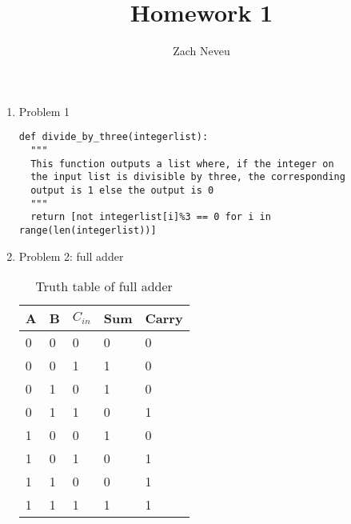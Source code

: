 \documentclass[12pt, letter]{article}
\author{Zach Neveu}
\title{ Homework 1 }
\begin{document}
\maketitle

\begin{enumerate}
	\item Problem 1
\begin{verbatim}
def divide_by_three(integerlist):
  """
  This function outputs a list where, if the integer on
  the input list is divisible by three, the corresponding
  output is 1 else the output is 0
  """
  return [not integerlist[i]%3 == 0 for i in range(len(integerlist))]
\end{verbatim}

	\item Problem 2: full adder
	\begin{table}[htpb]
		\centering
		\caption{Truth table of full adder}
		\label{tab:truth_table}
		\begin{tabular}{lllll}
		\toprule
		A & B & $C_{in}$ & Sum & Carry \\
		\midrule
		0 & 0 & 0 & 0 & 0 \\
		\midrule
		0 & 0 & 1 & 1 & 0 \\
		\midrule
		0 & 1 & 0 & 1 & 0 \\
		\midrule
		0 & 1 & 1 & 0 & 1 \\
		\midrule
		1 & 0 & 0 & 1 & 0 \\
		\midrule
		1 & 0 & 1 & 0 & 1 \\
		\midrule
		1 & 1 & 0 & 0 & 1 \\
		\midrule
		1 & 1 & 1 & 1 & 1 \\
		\bottomrule	
		\end{tabular}
	\end{table}

\end{enumerate}
\end{document}
